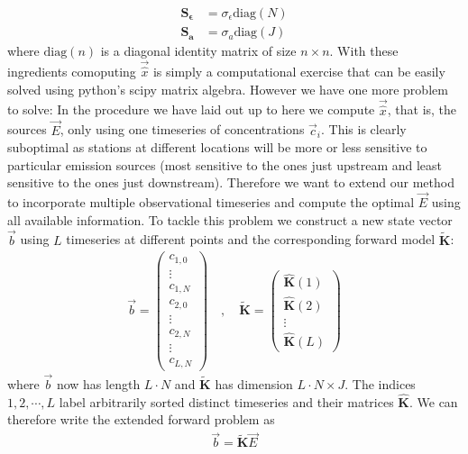 \documentclass[]{article}
\begin{document}
\begin{align}
\mathbf{S_\epsilon} &= \sigma_\epsilon \text{diag}(N) \\
\mathbf{S_a} &= \sigma_a \text{diag}(J)
\end{align}
where $\text{diag}(n)$ is a diagonal identity matrix of size $n\times n$. With these ingredients comoputing $\vec{\hat{x}}$ is simply a computational exercise that can be easily solved using python's scipy matrix algebra.
\newline \newline
However we have one more problem to solve: In the procedure we have laid out up to here we compute $\vec{\hat{x}}$, that is, the sources $\vec{E}$, only using one timeseries of concentrations $\vec{c}_i$. This is clearly suboptimal as stations at different locations will be more or less sensitive to particular emission sources (most sensitive to the ones just upstream and least sensitive to the ones just downstream). Therefore we want to extend our method to incorporate multiple observational timeseries and compute the optimal $\vec{E}$ using all available information. To tackle this problem we construct a new state vector $\vec{b}$ using $L$ timeseries at different points and the corresponding forward model $\mathbf{\tilde{K}}$:
\begin{align}
\vec{b} = 
\begin{pmatrix}
c_{1,0} \\
\vdots \\
c_{1,N} \\
c_{2,0} \\
\vdots \\
c_{2,N} \\
\vdots \\
c_{L,N}
\end{pmatrix}
\quad, \quad
\mathbf{\tilde{K}} = 
\begin{pmatrix}
\mathbf{\hat{K}}(1) \\
\mathbf{\hat{K}}(2) \\
\vdots \\
\mathbf{\hat{K}}(L)
\end{pmatrix}
\end{align}
where $\vec{b}$ now has length $L\cdot N$ and $\mathbf{\tilde{K}}$ has dimension $L\cdot N \times J$. The indices $1,2,\cdots,L$ label arbitrarily sorted distinct timeseries and their matrices $\mathbf{\hat{K}}$. We can therefore write the extended forward problem as
\begin{align}
\vec{b} = \mathbf{\tilde{K}} \vec{E}
\end{align}
\end{document}
